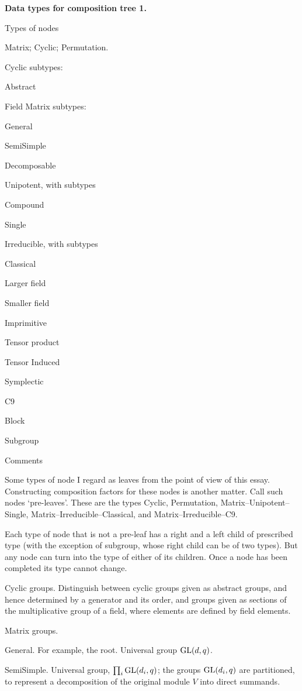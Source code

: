 \def\q{\quad}
\def\GL{{\rm GL}}
\centerline{\bf Data types for composition tree 1.}
\medskip
\centerline{Types of nodes}
Matrix; Cyclic; Permutation.

Cyclic subtypes: 

\q Abstract

\q Field
\medskip
Matrix subtypes:

\q General

\q SemiSimple

\q Decomposable

\q Unipotent, with subtypes

\q \q Compound

\q \q Single

\q Irreducible, with subtypes

\q\q Classical

\q\q Larger field

\q\q Smaller field

\q\q Imprimitive

\q\q Tensor product

\q\q Tensor Induced

\q\q Symplectic

\q\q C9

\q Block

\q Subgroup
\medskip
\centerline{Comments}
\medskip
Some types of node I regard as leaves from the point of view of this essay.  Constructing
composition factors for these nodes is another matter.  Call such nodes `pre-leaves'.
These are the types Cyclic, Permutation, Matrix--Unipotent--Single, Matrix--Irreducible--Classical,
and Matrix--Irreducible--C9.

Each type of node that is not a pre-leaf has a right and a left child of prescribed type (with
the exception of subgroup, whose right child can be of two types).  But any node can
turn into the type of either of its children.  Once a node has been completed its type cannot change.

Cyclic groups.  Distinguish between cyclic groups given as abstract groups, and hence 
determined by a generator and its order, and groups given as sections of the multiplicative
group of a field, where elements are defined by field elements.

Matrix groups.

General.  For example, the root.  Universal group $\GL (d,q)$.

SemiSimple.  Universal group, $\prod_i\GL(d_i,q)$; the groups $\GL(d_i,q)$ are partitioned, to
represent a decomposition of the original module $V$ into direct summands.

